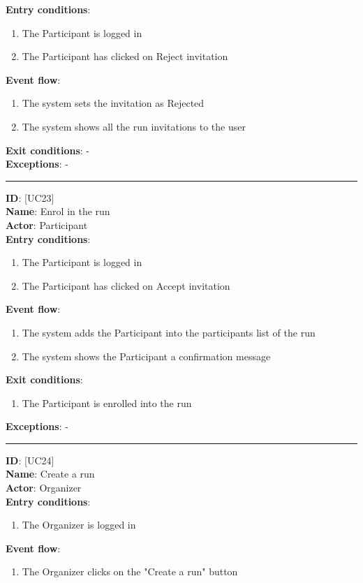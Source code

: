 \documentclass[a4paper, hidelinks, 12pt]{report}
\newcommand\usecase[1]{ [UC#1] }
\begin{document}
\begin{itemize}
		\textbf{Entry conditions}:
		\begin{enumerate}
			\item{The Participant is logged in}
			\item{The Participant has clicked on Reject invitation}
		\end{enumerate}
		\textbf{Event flow}:
		\begin{enumerate}
			\item{The system sets the invitation as Rejected}
			\item{The system shows all the run invitations to the user}
		\end{enumerate}
		\textbf{Exit conditions}: - \\
		\textbf{Exceptions}: - \\
		\rule{\linewidth}{0.4pt}
		\textbf{ID}: \usecase{23} \\
		\textbf{Name}: Enrol in the run \\
		\textbf{Actor}: Participant \\
		\textbf{Entry conditions}:
		\begin{enumerate}
			\item{The Participant is logged in}
			\item{The Participant has clicked on Accept invitation}
		\end{enumerate}
		\textbf{Event flow}:
		\begin{enumerate}
			\item{The system adds the Participant into the participants list of the run}
			\item{The system shows the Participant a confirmation message}
		\end{enumerate}
		\textbf{Exit conditions}:
		\begin{enumerate}
			\item{The Participant is enrolled into the run}
		\end{enumerate}
		\textbf{Exceptions}: - \\
		\rule{\linewidth}{0.4pt}
		\textbf{ID}: \usecase{24} \\
		\textbf{Name}: Create a run \\
		\textbf{Actor}: Organizer \\
		\textbf{Entry conditions}:
		\begin{enumerate}
			\item{The Organizer is logged in}
		\end{enumerate}
		\textbf{Event flow}:
		\begin{enumerate}
			\item{The Organizer clicks on the "Create a run" button}

\end{enumerate}
\end{itemize}
\end{document}
